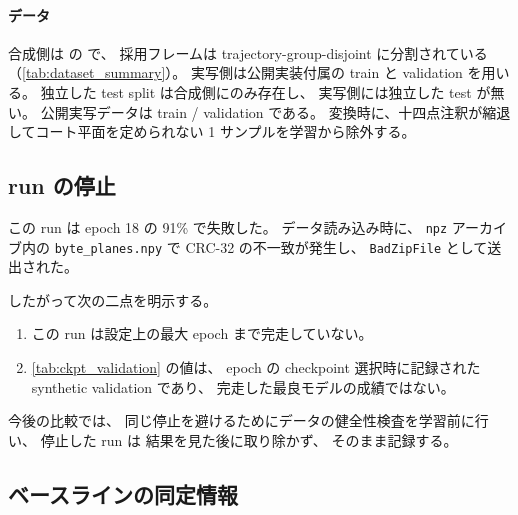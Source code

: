 \paragraph{データ}
合成側は \SyntheticDataset の \SceneSet で、
採用フレームは trajectory-group-disjoint に分割されている
（\cref{tab:dataset_summary}）。
実写側は公開実装付属の train と validation を用いる。
独立した test split は合成側にのみ存在し、
実写側には独立した test が無い。
公開実写データは train \TCDTrainCount / validation \TCDValCount である。
変換時に、十四点注釈が縮退してコート平面を定められない
1 サンプルを学習から除外する。

\subsection{run の停止}

この run は epoch 18 の 91\% で失敗した。
データ読み込み時に、
\texttt{npz} アーカイブ内の \texttt{byte\_planes.npy} で
CRC-32 の不一致が発生し、
\texttt{BadZipFile} として送出された。

したがって次の二点を明示する。

\begin{enumerate}[leftmargin=1.6em]
  \item この run は設定上の最大 epoch まで完走していない。
  \item \cref{tab:ckpt_validation} の値は、
  epoch \resCkptEpoch の checkpoint 選択時に記録された
  synthetic validation であり、
  完走した最良モデルの成績ではない。
\end{enumerate}

今後の比較では、
同じ停止を避けるためにデータの健全性検査を学習前に行い、
停止した run は
結果を見た後に取り除かず、
そのまま記録する。

\subsection{ベースラインの同定情報}

